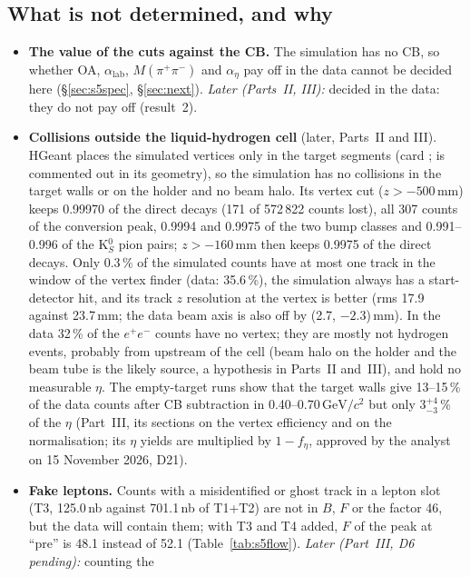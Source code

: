\documentclass[11pt,a4paper]{article}
\newcommand{\ee}{\ensuremath{e^{+}e^{-}}\xspace}
\newcommand{\Mpipi}{\ensuremath{M(\pi^{+}\pi^{-})}\xspace}
\newcommand{\GeVcc}{\ensuremath{\mathrm{GeV}/c^{2}}\xspace}
\newcommand{\code}[1]{\texttt{\detokenize{#1}}}
\begin{document}
\subsection{What is not determined, and why}
\label{sec:resnotdet}
\begin{itemize}\setlength{\itemsep}{1pt}
\item \textbf{The value of the cuts against the CB.} The simulation has no CB, so whether OA, $\alpha_{\mathrm{lab}}$,
      \Mpipi and $\alpha_\eta$ pay off in the data cannot be decided here (\S\ref{sec:s5spec}, \S\ref{sec:next}).
      \emph{Later (Parts~II, III):} decided in the data: they do not pay off (result~2).
\item \textbf{Collisions outside the liquid-hydrogen cell} (later, Parts~II and III). HGeant places the simulated vertices
      only in the target segments (card \code{JVER 2 2 0}; \code{start.geo} is commented out in its geometry), so the simulation
      has no collisions in the target walls or on the holder and no beam halo. Its vertex cut ($z>-500$\,mm) keeps 0.99970
      of the direct decays (171 of 572\,822 counts lost), all 307 counts of the conversion peak, 0.9994 and 0.9975 of the two
      bump classes and 0.991--0.996 of the K$^0_S$ pion pairs; $z>-160$\,mm then keeps 0.9975 of the direct decays. Only
      0.3\,\% of the simulated counts have at most one track in the window of the vertex finder (data: 35.6\,\%), the
      simulation always has a start-detector hit, and its track $z$ resolution at the vertex is better (rms 17.9 against
      23.7\,mm; the data beam axis is also off by (2.7, $-2.3$)\,mm). In the data 32\,\% of the \ee counts have no vertex;
      they are mostly not hydrogen events, probably from upstream of the cell (beam halo on the holder and the beam tube is the
      likely source, a hypothesis in Parts~II and~III), and hold no measurable $\eta$. The empty-target runs show that
      the target walls give 13--15\,\% of the data counts after CB subtraction in 0.40--0.70\,\GeVcc but only
      $3^{+4}_{-3}$\,\% of the $\eta$ (Part~III, its sections on the vertex efficiency and on the normalisation; its $\eta$
      yields are multiplied by $1-f_\eta$, approved by the analyst on 15 November 2026, D21).
\item \textbf{Fake leptons.} Counts with a misidentified or ghost track in a lepton slot (T3, 125.0\,nb against 701.1\,nb
      of T1+T2) are not in $B$, $F$ or the factor 46, but the data will contain them; with T3 and T4 added, $F$ of the
      peak at ``pre'' is 48.1 instead of 52.1 (Table~\ref{tab:s5flow}). \emph{Later (Part~III, D6 pending):} counting the

\end{itemize}
\end{document}
